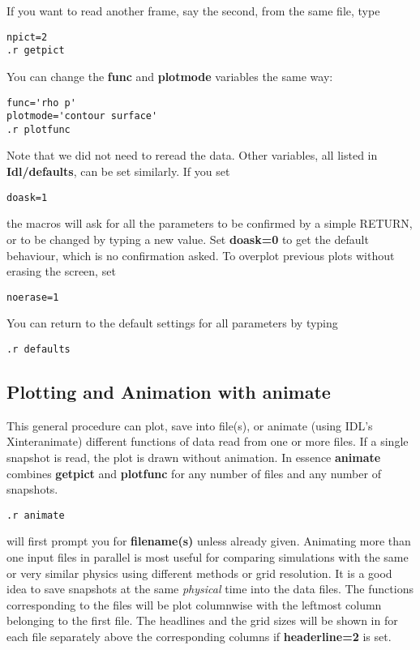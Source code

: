    If you want to read another frame, say the second, from the same file, type
\begin{verbatim}
npict=2
.r getpict
\end{verbatim}
   You can change the {\bf func} and {\bf plotmode} variables the same way:
\begin{verbatim}
func='rho p'
plotmode='contour surface'
.r plotfunc
\end{verbatim}
   Note that we did not need to reread the data.
   Other variables, all listed in {\bf Idl/defaults}, can be set similarly.
   If you set
\begin{verbatim}
doask=1
\end{verbatim}
   the macros will ask for all the parameters to be confirmed by a simple
   RETURN, or to be changed by typing a new value. Set {\bf doask=0} to
   get the default behaviour, which is no confirmation asked.
   To overplot previous plots without erasing the screen, set
\begin{verbatim}
noerase=1
\end{verbatim}
   You can return to the default settings for all parameters by typing
\begin{verbatim}
.r defaults
\end{verbatim}

\subsection{Plotting and Animation with animate \label{s-animate}}

   This general procedure can plot, save into file(s), or animate 
   (using IDL's Xinteranimate) different functions of data 
   read from one or more files. If a single snapshot is read, the
   plot is drawn without animation. In essence {\bf animate} combines
   {\bf getpict} and {\bf plotfunc} for any number of files and any number 
   of snapshots.
\begin{verbatim}
.r animate
\end{verbatim}
   will first prompt you for {\bf filename(s)} unless already given. 
   Animating more than one input files in parallel is
   most useful for comparing simulations with the same or very similar physics
   using different methods or grid resolution. It is a good idea to save 
   snapshots at the same {\it physical} time into the data files.
   The functions corresponding to the files will be plot columnwise
   with the leftmost column belonging to the first file.
   The headlines and the grid sizes will be shown in 
   for each file separately above the corresponding columns
   if {\bf headerline=2} is set.

